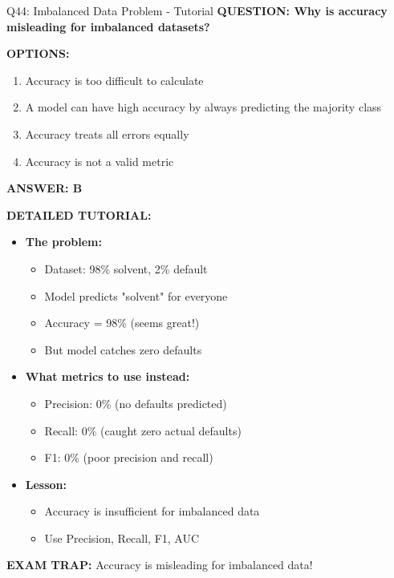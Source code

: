 \documentclass[8pt]{beamer}
\begin{document}
	\begin{frame}{Q44: Imbalanced Data Problem - Tutorial}
		\fontsize{6.5}{7.5}\selectfont
		\textbf{QUESTION: Why is accuracy misleading for imbalanced datasets?}
		
		\vspace{0.1cm}
		\textbf{OPTIONS:}
		\begin{enumerate}
			\item Accuracy is too difficult to calculate
			\item A model can have high accuracy by always predicting the majority class
			\item Accuracy treats all errors equally
			\item Accuracy is not a valid metric
		\end{enumerate}
		
		\vspace{0.1cm}
		\textcolor{myblue}{\textbf{ANSWER: B}}
		
		\vspace{0.1cm}
		\textbf{DETAILED TUTORIAL:}
		\begin{itemize}
			\item \textbf{The problem:}
			\begin{itemize}
				\item Dataset: 98\% solvent, 2\% default
				\item Model predicts "solvent" for everyone
				\item Accuracy = 98\% (seems great!)
				\item But model catches zero defaults
			\end{itemize}
			\item \textbf{What metrics to use instead:}
			\begin{itemize}
				\item Precision: 0\% (no defaults predicted)
				\item Recall: 0\% (caught zero actual defaults)
				\item F1: 0\% (poor precision and recall)
			\end{itemize}
			\item \textbf{Lesson:}
			\begin{itemize}
				\item Accuracy is insufficient for imbalanced data
				\item Use Precision, Recall, F1, AUC
			\end{itemize}
		\end{itemize}
		
		\textcolor{myred}{\textbf{EXAM TRAP:}} Accuracy is \textcolor{myblue}{misleading for imbalanced data}!
	\end{frame}
	
\end{document}
